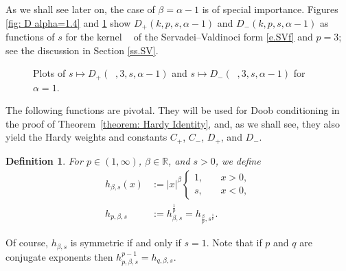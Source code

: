 \documentclass[12pt, a4paper]{amsart}
\newtheorem{definition}[theorem]{Definition}
\DeclareMathOperator{\mass}{\widetilde{\nu}_{\alpha}}
\newcommand{\R}{\mathbb{R}}
\begin{document}
As we shall see later on, the case of $\beta=\alpha-1$ is of special importance.
 Figures \ref{fig: D alpha=1.4} and \ref{fig: D alpha = 1} show $D_+(k, p, s, \alpha-1)$ and $D_-(k, p, s, \alpha-1)$ as functions of $s$ for the kernel $\mass$ of the Servadei--Valdinoci form \eqref{e.SVf} and $p = 3$; see the discussion  in Section \cref{ss.SV}.
\begin{figure}[H]
\caption{Plots of  $s \mapsto D_+(\mass, 3, s, \alpha-1)$ and $s \mapsto D_-(\mass, 3, s, \alpha-1)$ for $\alpha=1$.}
\label{fig: D alpha = 1}
\end{figure}


The following functions are pivotal. They will be used for Doob conditioning in the proof of Theorem~\ref{theorem: Hardy Identity}, and, as we shall see, they also yield the Hardy weights and  constants $C_+$, $C_-$, $D_+$, and $D_-$.

\begin{definition} For $p \in (1, \infty)$, $\beta \in \R$, and $s > 0$, we define
\begin{align}
    h_{\beta, s}(x) &:= |x|^{\beta}\begin{cases}
        1, &\quad x > 0,
        \\
        s, &\quad x<0,
    \end{cases}\label{e.dhbs}
    \\
    h_{p, \beta, s} &:= h_{\beta, s}^{\frac{1}{p}} = h_{\frac{\beta}{p}, s^{\frac{1}{p}}}.
\end{align}
\end{definition}
Of course, $h_{\beta,s}$ is symmetric if and only if $s=1$. Note that if $p$ and $q$ are conjugate exponents then $h_{p, \beta, s}^{p-1} = h_{q, \beta, s}$.
\end{document}
